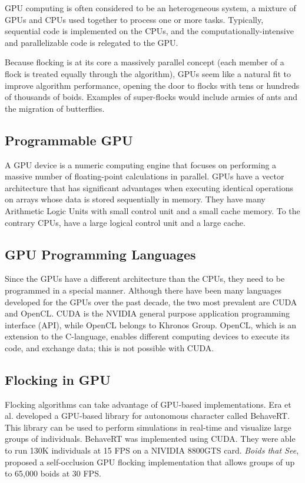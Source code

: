 GPU computing is often considered to be an heterogeneous system, a mixture of GPUs and CPUs used together to process one or more tasks. Typically, sequential code is implemented on the CPUs, and the computationally-intensive and parallelizable code is relegated to the GPU.

Because flocking is at its core a massively parallel concept (each member of a flock is treated equally through the algorithm), GPUs seem like a natural fit to improve algorithm performance, opening the door to flocks with tens or hundreds of thousands of boids. Examples of super-flocks would include armies of ants and the migration of butterflies. 


\subsection{Programmable GPU}
A GPU device is a numeric computing engine\cite{GPUbook} that focuses on performing a massive number of floating-point calculations in parallel. GPUs have a vector architecture that has significant advantages when executing identical operations on arrays whose data is stored sequentially in memory. They have many Arithmetic Logic Units with small control unit and a small cache memory. To the contrary CPUs, have a large logical control unit and a large cache. 

\subsection{GPU Programming Languages}
Since the GPUs have a different architecture than the CPUs, they need to be programmed in a special manner. Although there have been many languages developed for the GPUs over the past decade, the two most prevalent are CUDA and OpenCL. CUDA is the NVIDIA  general purpose application programming interface (API)\cite{CUDAandOpenCL}, while OpenCL belongs to Khronos Group\cite{opencl}. OpenCL, which is an extension to the C-language,  enables different computing devices to execute its code, and exchange data; this is not 
possible with CUDA.
 
\subsection{Flocking in GPU}\label{flockingGPU}
Flocking algorithms can take advantage of GPU-based implementations. Era et al. developed a GPU-based library for autonomous character called BehaveRT\cite{BehaveRT}. This library can be used to perform simulations in real-time and visualize large groups of individuals. BehaveRT was implemented using CUDA. They were able to run 130K individuals at 15 FPS on a NIVIDIA 8800GTS card. \textit{Boids that See}, proposed a self-occlusion GPU flocking implementation that allows groups of up to 65,000 boids at 30 FPS\cite{boidsThatSee}. 

